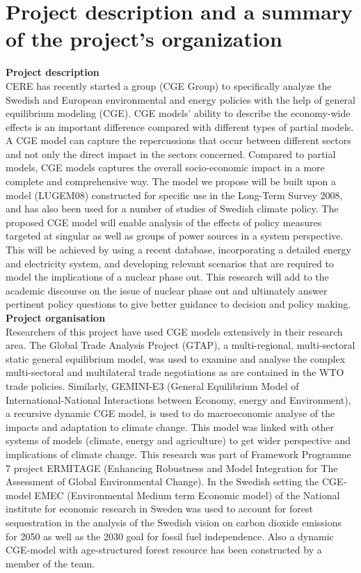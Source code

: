 \section{Project description and a summary of the project's organization}
\textbf{Project description}\\
CERE has recently started a group (CGE Group) to specifically analyze the Swedish and European environmental and energy policies with the help of general equilibrium modeling (CGE). CGE models' ability to describe the economy-wide effects is an important difference compared with different types of partial models. A CGE model can capture the repercussions that occur between different sectors and not only the direct impact in the sectors concerned. Compared to partial models, CGE models captures the overall socio-economic impact in a more complete and comprehensive way. The model we propose will be built upon a model (LUGEM08) constructed for specific use in the Long-Term Survey 2008, and has also been used for a number of studies of Swedish climate policy. The proposed CGE model will enable analysis of the effects of policy measures targeted at singular as well as groups of power sources in a system perspective. This will be achieved by using a recent database, incorporating a detailed energy and electricity system, and developing relevant scenarios that are required to model the implications of a nuclear phase out. This research will add to the academic discourse on the issue of nuclear phase out and ultimately answer pertinent policy questions to give better guidance to decision and policy making.\\

\textbf{Project organisation}\\
Researchers of this project have used CGE models extensively in their research area. The Global Trade Analysis Project (GTAP), a multi-regional, multi-sectoral static general equilibrium model, was used to examine and analyse the complex multi-sectoral and multilateral trade negotiations as are contained in the WTO trade policies. Similarly, GEMINI-E3 (General Equilibrium Model of International-National Interactions between Economy, energy and Environment), a recursive dynamic CGE model, is used to do macroeconomic analyse of the impacts and adaptation to climate change. This model was linked with other systems of models (climate, energy and agriculture) to get wider perspective and implications of climate change. This research was part of Framework Programme 7 project ERMITAGE (Enhancing Robustness and Model Integration for The Assessment of Global Environmental Change). In the Swedish setting the CGE-model EMEC (Environmental Medium term Economic model) of the National institute for economic research in Sweden was used to account for forest sequestration in the analysis of the Swedish vision on carbon dioxide emissions for 2050 as well as the 2030 goal for fossil fuel independence. Also a dynamic CGE-model with age-structured forest resource \citep{furtenback2011three} has been constructed by a member of the team.\\

